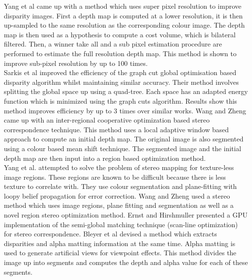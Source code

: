 Yang et al \cite{Yang07Spatial} came up with a method which uses super pixel resolution to improve disparity images. First a depth map is computed at a lower resolution, it is then up-sampled to the same resolution as the corresponding colour image. The depth map is then used as a hypothesis to compute a cost volume, which is bilateral filtered. Then, a winner take all and a sub pixel estimation procedure are performed to estimate the full resolution depth map. This method is shown to improve sub-pixel resolution by up to 100 times.\\


Sarkis et al \cite{Sarkis07Fast} improved the efficiency of the graph cut global optimisation based disparity algorithm whilst maintaining similar accuracy. Their method involves splitting the global space up using a quad-tree. Each space has an adapted energy function which is minimized using the graph cuts algorithm. Results show this method improves efficiency by up to 3 times over similar works. Wang and Zheng \cite{Wang08Region} came up with an inter-regional cooperative optimization based stereo correspondence technique. This method uses a local adaptive window based approach to compute an initial depth map. The original image is also segmented using a colour based mean shift technique. The segmented image and the initial depth map are then input into a region based optimization method.  \\


Yang et al. \cite{Yang08Near} attempted to solve the problem of stereo mapping for texture-less image regions. These regions are known to be difficult because there is less texture to correlate with. They use colour segmentation and plane-fitting with loopy belief propagation for error correction. Wang and Zheng \cite{Wang08Region} used a stereo method which uses image regions, plane fitting and segmentation as well as a novel region stereo optimization method. Ernst and Hirshmuller \cite{Ernst08Mutual} presented a GPU implementation of the semi-global matching technique (scan-line optimization) for stereo correspondence. Bleyer et al \cite{Bleyer09Stereo} devised a method which extracts disparities and alpha matting information at the same time. Alpha matting is used to generate artificial views for viewpoint effects. This method divides the image up into segments and computes the depth and alpha value for each of these segments. \\


